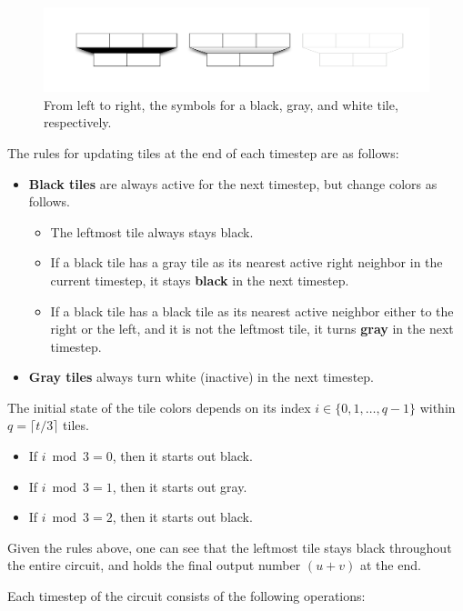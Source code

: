 \begin{figure}[htb!]
\centerline{
\includegraphics[width=5.5in]{figures/csa-tile-colors.pdf}
}
\caption{From left to right, the symbols for a black, gray, and white tile,
respectively.}
\label{fig:tile-colors}
\end{figure}


The rules for
updating tiles at the end of each timestep are as follows:

\begin{itemize}
\item \textbf{Black tiles} are always active for the next timestep, but
change colors as follows.
\begin{itemize}
\item The leftmost tile always stays black.
\item If a black tile has a gray tile as its nearest active right neighbor in
the current timestep,
it stays \textbf{black} in the next timestep.
\item If a black tile has a black tile as its nearest active neighbor either
to the right or the left, and it is not the leftmost tile,
it turns \textbf{gray} in the next timestep.
\end{itemize}
\item \textbf{Gray tiles} always turn white (inactive) in the next timestep.
\end{itemize}

The initial state of the tile colors depends on its index
$i \in \{0, 1, \ldots, q-1\}$ within $q = \lceil t/3 \rceil$ tiles.

\begin{itemize}
\item If $i \bmod 3 = 0$, then it starts out black.
\item If $i \bmod 3 = 1$, then it starts out gray.
\item If $i \bmod 3 = 2$, then it starts out black.
\end{itemize}

Given the rules above, one can see that the leftmost tile stays black
throughout the entire circuit, and holds the final output number $(u+v)$ at
the end.

Each timestep of the circuit consists of the following operations:

